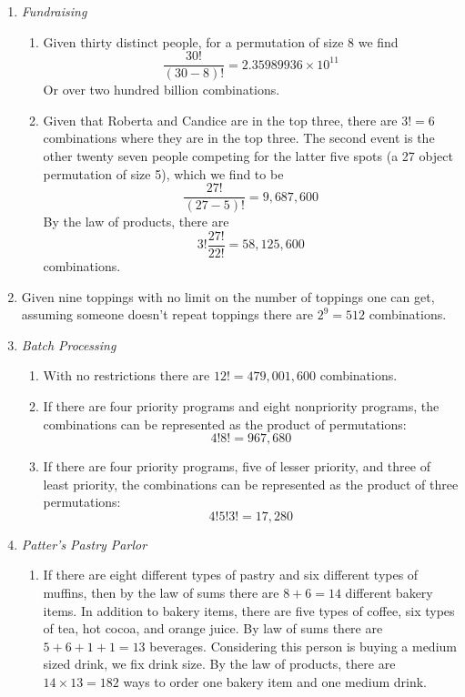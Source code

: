 \documentclass[a4paper,12pt]{article}
\theoremstyle{definition}
\theoremstyle{remark}
\begin{document}
\begin{enumerate}
\item \textit{Fundraising}
\begin{enumerate}
    \item Given thirty distinct people, for a permutation of size 8 we find\begin{equation*}
        \frac{30!}{(30-8)!}=2.35989936\times10^{11}
    \end{equation*} Or over two hundred billion combinations. 
    \item Given that Roberta and Candice are in the top three, there are $3!=6$ combinations where they are in the top three. The second event is the other twenty seven people competing for the latter five spots (a 27 object permutation of size 5), which we find to be \begin{equation*}
        \frac{27!}{(27-5)!}=9,687,600
    \end{equation*} By the law of products, there are\begin{equation*}
        3!\frac{27!}{22!}=58,125,600
    \end{equation*} combinations.
\end{enumerate}
\item Given nine toppings with no limit on the number of toppings one can get, assuming someone doesn't repeat toppings there are $2^9=512$ combinations.
\item \textit{Batch Processing}
\begin{enumerate}
    \item With no restrictions there are $12!=479,001,600$ combinations.
    \item If there are four priority programs and eight nonpriority programs, the combinations can be represented as the product of permutations:\begin{equation*}
        4!8!=967,680
    \end{equation*}
    \item If there are four priority programs, five of lesser priority, and three of least priority, the combinations can be represented as the product of three permutations: \begin{equation*}
        4!5!3!=17,280
    \end{equation*}
\end{enumerate}
\item \textit{Patter's Pastry Parlor}
\begin{enumerate}
    \item If there are eight different types of pastry and six different types of muffins, then by the law of sums there are $8+6=14$ different bakery items. In addition to bakery items, there are five types of coffee, six types of tea, hot cocoa, and orange juice. By law of sums there are $5+6+1+1=13$ beverages. Considering this person is buying a medium sized drink, we fix drink size. By the law of products, there are $14\times13=182$ ways to order one bakery item and one medium drink. 

\end{enumerate}
\end{enumerate}
\end{document}
